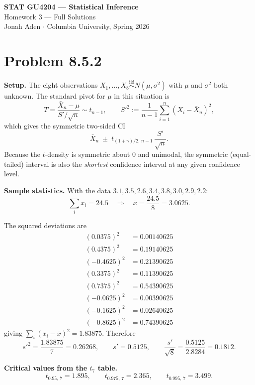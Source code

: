 \documentclass[11pt]{article}
\begin{document}
\begin{center}
    {\large\textbf{STAT GU4204 --- Statistical Inference}}\\[2pt]
    {\normalsize Homework 3 --- Full Solutions}\\[2pt]
    {\small Jonah Aden \quad $\cdot$ \quad Columbia University, Spring 2026}
\end{center}

\vspace{1em}

\section*{Problem 8.5.2}
\textbf{Setup.} The eight observations $X_1,\dots,X_8 \stackrel{\text{iid}}{\sim} N(\mu,\sigma^2)$ with $\mu$ and $\sigma^2$ both unknown. The standard pivot for $\mu$ in this situation is
\[
T = \frac{\bar{X}_n - \mu}{S'/\sqrt{n}} \sim t_{n-1},
\qquad
S'^2 := \frac{1}{n-1}\sum_{i=1}^n (X_i - \bar{X}_n)^2,
\]
which gives the symmetric two-sided CI
\[
\bar{X}_n \;\pm\; t_{(1+\gamma)/2,\,n-1}\,\frac{S'}{\sqrt{n}}.
\]
Because the $t$-density is symmetric about $0$ and unimodal, the symmetric (equal-tailed) interval is also the \emph{shortest} confidence interval at any given confidence level.

\textbf{Sample statistics.} With the data $3.1, 3.5, 2.6, 3.4, 3.8, 3.0, 2.9, 2.2$:
\[
\sum_i x_i = 24.5
\quad\Longrightarrow\quad
\bar{x} = \frac{24.5}{8} = 3.0625.
\]

The squared deviations are
\begin{align*}
(0.0375)^2 &= 0.00140625 \\
(0.4375)^2 &= 0.19140625 \\
(-0.4625)^2 &= 0.21390625 \\
(0.3375)^2 &= 0.11390625 \\
(0.7375)^2 &= 0.54390625 \\
(-0.0625)^2 &= 0.00390625 \\
(-0.1625)^2 &= 0.02640625 \\
(-0.8625)^2 &= 0.74390625
\end{align*}
giving $\sum_i (x_i - \bar{x})^2 = 1.83875$. Therefore
\[
s'^2 = \frac{1.83875}{7} = 0.26268,
\qquad
s' = 0.5125,
\qquad
\frac{s'}{\sqrt{8}} = \frac{0.5125}{2.8284} = 0.1812.
\]

\textbf{Critical values from the $t_7$ table.}
\[
t_{0.95,\,7} = 1.895, \qquad
t_{0.975,\,7} = 2.365, \qquad
t_{0.995,\,7} = 3.499.
\]
\end{document}
